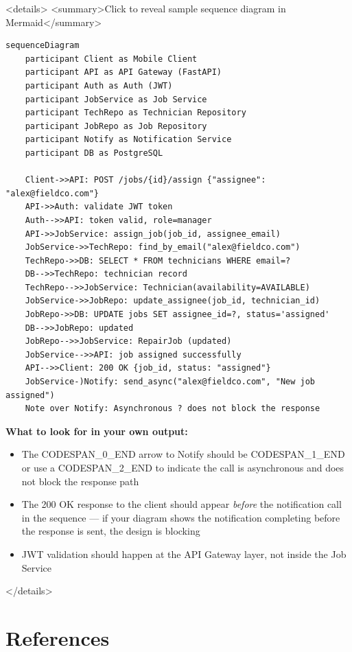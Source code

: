 \documentclass[11pt,a4paper]{book}
\begin{document}
<details>
<summary>Click to reveal sample sequence diagram in Mermaid</summary>

\begin{lstlisting}
sequenceDiagram
    participant Client as Mobile Client
    participant API as API Gateway (FastAPI)
    participant Auth as Auth (JWT)
    participant JobService as Job Service
    participant TechRepo as Technician Repository
    participant JobRepo as Job Repository
    participant Notify as Notification Service
    participant DB as PostgreSQL

    Client->>API: POST /jobs/{id}/assign {"assignee": "alex@fieldco.com"}
    API->>Auth: validate JWT token
    Auth-->>API: token valid, role=manager
    API->>JobService: assign_job(job_id, assignee_email)
    JobService->>TechRepo: find_by_email("alex@fieldco.com")
    TechRepo->>DB: SELECT * FROM technicians WHERE email=?
    DB-->>TechRepo: technician record
    TechRepo-->>JobService: Technician(availability=AVAILABLE)
    JobService->>JobRepo: update_assignee(job_id, technician_id)
    JobRepo->>DB: UPDATE jobs SET assignee_id=?, status='assigned'
    DB-->>JobRepo: updated
    JobRepo-->>JobService: RepairJob (updated)
    JobService-->>API: job assigned successfully
    API-->>Client: 200 OK {job_id, status: "assigned"}
    JobService-)Notify: send_async("alex@fieldco.com", "New job assigned")
    Note over Notify: Asynchronous ? does not block the response
\end{lstlisting}

\textbf{What to look for in your own output:}
\begin{itemize}
  \item The CODESPAN\_0\_END arrow to Notify should be CODESPAN\_1\_END or use a CODESPAN\_2\_END to indicate the call is asynchronous and does not block the response path
  \item The 200 OK response to the client should appear \textit{before} the notification call in the sequence --- if your diagram shows the notification completing before the response is sent, the design is blocking
  \item JWT validation should happen at the API Gateway layer, not inside the Job Service
\end{itemize}

</details>

\medskip

\section{References}
\end{document}
